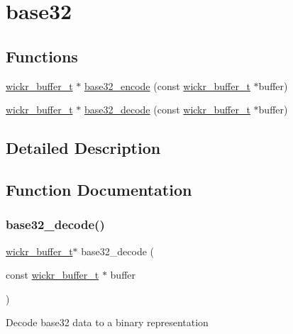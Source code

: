 \hypertarget{group__base32}{}\section{base32}
\label{group__base32}
\subsection*{Functions}
\begin{DoxyCompactItemize}
\item 
\mbox{\hyperlink{structwickr__buffer}{wickr\+\_\+buffer\+\_\+t}} $\ast$ \mbox{\hyperlink{group__base32_ga343c12edab05fb3b98a18474e20487c6}{base32\+\_\+encode}} (const \mbox{\hyperlink{structwickr__buffer}{wickr\+\_\+buffer\+\_\+t}} $\ast$buffer)
\item 
\mbox{\hyperlink{structwickr__buffer}{wickr\+\_\+buffer\+\_\+t}} $\ast$ \mbox{\hyperlink{group__base32_ga2ef9e4c1b2b030599d1e3199254af7c3}{base32\+\_\+decode}} (const \mbox{\hyperlink{structwickr__buffer}{wickr\+\_\+buffer\+\_\+t}} $\ast$buffer)
\end{DoxyCompactItemize}


\subsection{Detailed Description}


\subsection{Function Documentation}
\mbox{\label{group__base32_ga2ef9e4c1b2b030599d1e3199254af7c3}} 
\subsubsection{\texorpdfstring{base32\_decode()}{base32\_decode()}}
{\footnotesize\ttfamily \mbox{\hyperlink{structwickr__buffer}{wickr\+\_\+buffer\+\_\+t}}$\ast$ base32\+\_\+decode (\begin{DoxyParamCaption}\item[{const \mbox{\hyperlink{structwickr__buffer}{wickr\+\_\+buffer\+\_\+t}} $\ast$}]{buffer }\end{DoxyParamCaption})}

Decode base32 data to a binary representation


